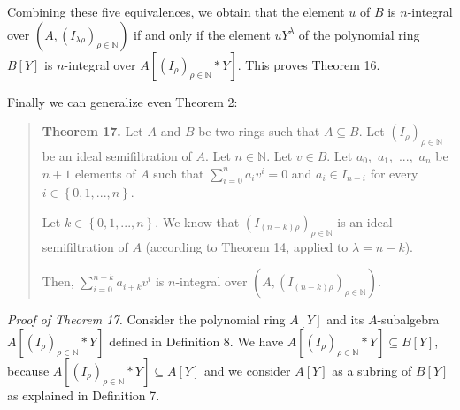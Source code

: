 \documentclass[12pt,final,notitlepage,onecolumn]{article}%
\begin{document}
Combining these five equivalences, we obtain that the element $u$ of $B$ is
$n$-integral over $\left(  A,\left(  I_{\lambda\rho}\right)  _{\rho
\in\mathbb{N}}\right)  $ if and only if the element $uY^{\lambda}$ of the
polynomial ring $B\left[  Y\right]  $ is $n$-integral over $A\left[  \left(
I_{\rho}\right)  _{\rho\in\mathbb{N}}\ast Y\right]  .$ This proves Theorem 16.

Finally we can generalize even Theorem 2:

\begin{quote}
\textbf{Theorem 17.} Let $A$ and $B$ be two rings such that $A\subseteq B$.
Let $\left(  I_{\rho}\right)  _{\rho\in\mathbb{N}}$ be an ideal semifiltration
of $A$. Let $n\in\mathbb{N}$. Let $v\in B$. Let $a_{0},$ $a_{1},$ $...,$
$a_{n}$ be $n+1$ elements of $A$ such that $\sum\limits_{i=0}^{n}a_{i}v^{i}=0$
and $a_{i}\in I_{n-i}$ for every $i\in\left\{  0,1,...,n\right\}  $.

Let $k\in\left\{  0,1,...,n\right\}  $. We know that $\left(  I_{\left(
n-k\right)  \rho}\right)  _{\rho\in\mathbb{N}}$ is an ideal semifiltration of
$A$ (according to Theorem 14, applied to $\lambda=n-k$).

Then, $\sum\limits_{i=0}^{n-k}a_{i+k}v^{i}$ is $n$-integral over $\left(
A,\left(  I_{\left(  n-k\right)  \rho}\right)  _{\rho\in\mathbb{N}}\right)  $.
\end{quote}

\textit{Proof of Theorem 17.} Consider the polynomial ring $A\left[  Y\right]
$ and its $A$-subalgebra $A\left[  \left(  I_{\rho}\right)  _{\rho
\in\mathbb{N}}\ast Y\right]  $ defined in Definition 8. We have $A\left[
\left(  I_{\rho}\right)  _{\rho\in\mathbb{N}}\ast Y\right]  \subseteq B\left[
Y\right]  $, because $A\left[  \left(  I_{\rho}\right)  _{\rho\in\mathbb{N}%
}\ast Y\right]  \subseteq A\left[  Y\right]  $ and we consider $A\left[
Y\right]  $ as a subring of $B\left[  Y\right]  $ as explained in Definition 7.
\end{document}
